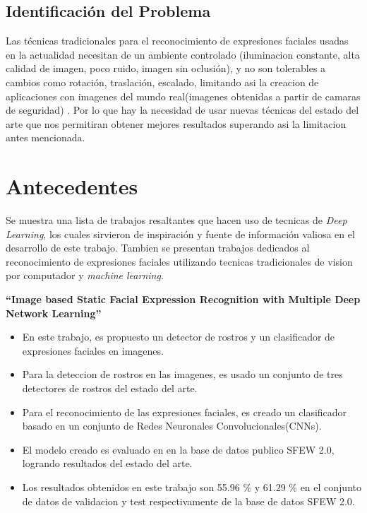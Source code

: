 \subsection{Identificación del Problema}
Las técnicas tradicionales para el reconocimiento de expresiones faciales usadas en la actualidad necesitan de un ambiente controlado (iluminacion constante, alta calidad de imagen, poco ruido, imagen sin oclusión), y no son tolerables a cambios como rotación, traslación, escalado, limitando asi la creacion de aplicaciones con imagenes del mundo real(imagenes obtenidas a partir de camaras de seguridad) . Por lo que hay la necesidad de usar nuevas técnicas del estado del arte que nos permitiran obtener mejores resultados superando asi la limitacion antes mencionada.

\section{Antecedentes}
Se muestra una lista de trabajos resaltantes que hacen uso de tecnicas de \textit{Deep Learning}, los cuales sirvieron de inspiración y fuente de información valiosa en el desarrollo de este trabajo. Tambien se presentan trabajos dedicados al reconocimiento de expresiones faciales utilizando tecnicas tradicionales de vision por computador y \textit{machine learning}.

\vspace{1cm}
\textbf{“Image based Static Facial Expression Recognition with Multiple Deep Network Learning” \cite{yu2015image}}\\

\begin{itemize}
\item En este trabajo, es propuesto un detector de rostros y un clasificador de expresiones faciales en imagenes.
\item Para la deteccion de rostros en las imagenes, es usado un conjunto de tres detectores de rostros del estado del arte. 
\item Para el reconocimiento de las expresiones faciales, es creado un clasificador basado en un conjunto de 
Redes Neuronales Convolucionales(CNNs).
\item El modelo creado es evaluado en en la base de datos publico SFEW 2.0, logrando resultados del estado del arte.
\item Los resultados obtenidos en este trabajo
son 55.96 \% y 61.29 \% en el conjunto de datos de validacion y test respectivamente de la base de datos SFEW 2.0.
\end{itemize}

